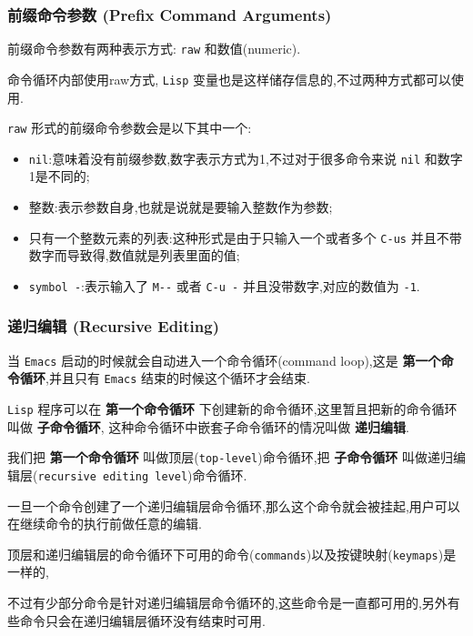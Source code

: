 \documentclass[11pt]{article}
\begin{document}
\subsubsection{前缀命令参数 (Prefix Command Arguments)}
\label{sec:org8192407}

前缀命令参数有两种表示方式: \texttt{raw} 和数值(numeric).

命令循环内部使用raw方式, \texttt{Lisp} 变量也是这样储存信息的,不过两种方式都可以使用.

\texttt{raw} 形式的前缀命令参数会是以下其中一个:

\begin{itemize}
\item \texttt{nil}:意味着没有前缀参数,数字表示方式为1,不过对于很多命令来说 \texttt{nil} 和数字1是不同的;

\item 整数:表示参数自身,也就是说就是要输入整数作为参数;

\item 只有一个整数元素的列表:这种形式是由于只输入一个或者多个 \texttt{C-us} 并且不带数字而导致得,数值就是列表里面的值;

\item \texttt{symbol -}:表示输入了 \texttt{M-{}-{}} 或者 \texttt{C-u -} 并且没带数字,对应的数值为 \texttt{-1}.
\end{itemize}


\subsubsection{递归编辑 (Recursive Editing)}
\label{sec:org3bfc641}

当 \texttt{Emacs} 启动的时候就会自动进入一个命令循环(command loop),这是 \textbf{第一个命令循环},并且只有 \texttt{Emacs} 结束的时候这个循环才会结束.

\texttt{Lisp} 程序可以在 \textbf{第一个命令循环} 下创建新的命令循环,这里暂且把新的命令循环叫做 \textbf{子命令循环}, 这种命令循环中嵌套子命令循环的情况叫做 \textbf{递归编辑}.

我们把 \textbf{第一个命令循环} 叫做顶层(\texttt{top-level})命令循环,把 \textbf{子命令循环} 叫做递归编辑层(\texttt{recursive editing level})命令循环.

一旦一个命令创建了一个递归编辑层命令循环,那么这个命令就会被挂起,用户可以在继续命令的执行前做任意的编辑.

顶层和递归编辑层的命令循环下可用的命令(\texttt{commands})以及按键映射(\texttt{keymaps})是一样的,

不过有少部分命令是针对递归编辑层命令循环的,这些命令是一直都可用的,另外有些命令只会在递归编辑层循环没有结束时可用.
\end{document}
